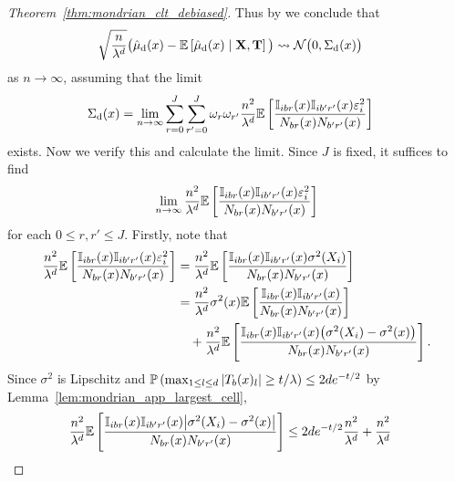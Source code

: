 \begin{proof}[Theorem~\ref{thm:mondrian_clt_debiased}]
  Thus by \citet[Theorem~3.2]{hall1980martingale}
  we conclude that
  \begin{align*}
    \sqrt{\frac{n}{\lambda^d}}
    \big(
      \hat\mu_\rd(x)
      - \E\left[
        \hat\mu_\rd(x) \mid \bX, \bT
      \right]
    \big)
    &\rightsquigarrow
    \cN\big(0, \Sigma_\rd(x)\big)
  \end{align*}
  as $n \to \infty$, assuming that the limit
  \begin{align*}
    \Sigma_\rd(x)
    &=
    \lim_{n \to \infty}
    \sum_{r=0}^{J}
    \sum_{r'=0}^{J}
    \omega_r
    \omega_{r'}
    \frac{n^2}{\lambda^d}
    \E \left[
      \frac{\I_{i b r}(x) \I_{i b' r'}(x) \varepsilon_i^2}
      {N_{b r}(x) N_{b' r'}(x)}
    \right]
  \end{align*}
  exists. Now we verify this and calculate the limit.
  Since $J$ is fixed, it suffices to find
  \begin{align*}
    \lim_{n \to \infty}
    \frac{n^2}{\lambda^d}
    \E \left[
      \frac{\I_{i b r}(x) \I_{i b' r'}(x) \varepsilon_i^2}
      {N_{b r}(x) N_{b' r'}(x)}
    \right]
  \end{align*}
  for each $0 \leq r, r' \leq J$.
  Firstly, note that
  \begin{align*}
    \frac{n^2}{\lambda^d}
    \E \left[
      \frac{\I_{i b r}(x) \I_{i b' r'}(x) \varepsilon_i^2}
      {N_{b r}(x) N_{b' r'}(x)}
    \right]
    &=
    \frac{n^2}{\lambda^d}
    \E \left[
      \frac{\I_{i b r}(x) \I_{i b' r'}(x) \sigma^2(X_i)}
      {N_{b r}(x) N_{b' r'}(x)}
    \right] \\
    &=
    \frac{n^2}{\lambda^d}
    \sigma^2(x)
    \E \left[
      \frac{\I_{i b r}(x) \I_{i b' r'}(x)}
      {N_{b r}(x) N_{b' r'}(x)}
    \right] \\
    &\quad+
    \frac{n^2}{\lambda^d}
    \E \left[
      \frac{\I_{i b r}(x) \I_{i b' r'}(x)
      \big(\sigma^2(X_i) - \sigma^2(x) \big)}
      {N_{b r}(x) N_{b' r'}(x)}
    \right].
  \end{align*}
  Since $\sigma^2$ is Lipschitz and
  $\P \left(\max_{1 \leq l \leq d}
  |T_b(x)_l| \geq t/\lambda \right) \leq 2d e^{-t/2}$
  by Lemma~\ref{lem:mondrian_app_largest_cell},
  \begin{align*}
    \frac{n^2}{\lambda^d}
    \E \left[
      \frac{\I_{i b r}(x) \I_{i b' r'}(x)
      \big|\sigma^2(X_i) - \sigma^2(x) \big|}
      {N_{b r}(x) N_{b' r'}(x)}
    \right]
    &\leq
    2de^{-t/2}
    \frac{n^2}{\lambda^d}
    + \frac{n^2}{\lambda^d}

\end{align*}
\end{proof}
